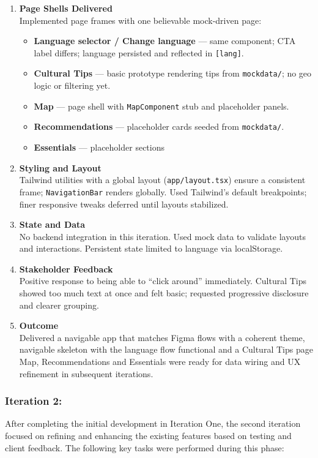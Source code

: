 \begin{enumerate}
    \item \textbf{Page Shells Delivered} \\
    Implemented page frames with one believable mock-driven page:
    \begin{itemize}
        \item \textbf{Language selector / Change language} — same component; CTA label differs; language persisted and reflected in \verb|[lang]|.
        \item \textbf{Cultural Tips} — basic prototype rendering tips from \texttt{mockdata/}; no geo logic or filtering yet.
        \item \textbf{Map} — page shell with \texttt{MapComponent} stub and placeholder panels.
        \item \textbf{Recommendations} — placeholder cards seeded from \texttt{mockdata/}.
        \item \textbf{Essentials} — placeholder sections 
    \end{itemize}

    \item \textbf{Styling and Layout} \\
    Tailwind utilities with a global layout (\verb|app/layout.tsx|) ensure a consistent frame; \texttt{NavigationBar} renders globally. Used Tailwind’s default breakpoints; finer responsive tweaks deferred until layouts stabilized.

    \item \textbf{State and Data} \\
    No backend integration in this iteration. Used mock data to validate layouts and interactions. Persistent state limited to language via localStorage.

    \item \textbf{Stakeholder Feedback} \\
    Positive response to being able to ``click around'' immediately. Cultural Tips showed too much text at once and felt basic; requested progressive disclosure and clearer grouping.

    \item \textbf{Outcome} \\
    Delivered a navigable app that matches Figma flows with a coherent theme, navigable skeleton with the language flow functional and a Cultural Tips page Map, Recommendations and Essentials were ready for data wiring and UX refinement in subsequent iterations.
\end{enumerate}

\subsubsection{Iteration 2:}
After completing the initial development in Iteration One, the second iteration focused on refining and enhancing the existing features based on testing and client feedback. The following key tasks were performed during this phase:

